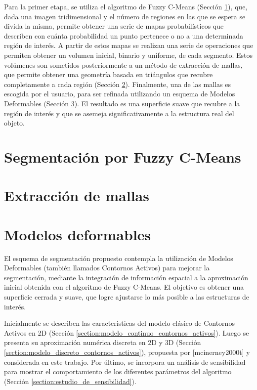 Para la primer etapa, se utiliza el algoritmo de Fuzzy C-Means (Sección \ref{section:segmentacion_fuzzy}), que, dada una imagen tridimensional y el número de regiones en las que se espera se divida la misma, permite obtener una serie de mapas probabilísticos que describen con cuánta probabilidad un punto pertenece o no a una determinada región de interés. A partir de estos mapas se realizan una serie de operaciones que permiten obtener un volumen inicial, binario y uniforme, de cada segmento. Estos volúmenes son sometidos posteriormente a un método de extracción de mallas, que permite obtener una geometría basada en triángulos que recubre completamente a cada región (Sección \ref{section:extraccion_de_mallas}). Finalmente, una de las mallas es escogida por el usuario, para ser refinada utilizando un esquema de Modelos Deformables (Sección \ref{section:modelos_deformables}). El resultado es una superficie suave que recubre a la región de interés y que se asemeja significativamente a la estructura real del objeto.

\section{Segmentación por Fuzzy C-Means}\label{section:segmentacion_fuzzy}

\section{Extracción de mallas}\label{section:extraccion_de_mallas}
\section{Modelos deformables}\label{section:modelos_deformables}
El esquema de segmentación propuesto contempla la utilización de Modelos Deformables (también llamados Contornos Activos) para mejorar la segmentación, mediante la integración de información espacial a la aproximación inicial obtenida con el algoritmo de Fuzzy C-Means. El objetivo es obtener una superficie cerrada y suave, que logre ajustarse lo más posible a las estructuras de interés.

Inicialmente se describen las caracteristicas del modelo clásico de Contornos Activos en 2D \citep{kass1988snakes} (Sección \ref{section:modelo_continuo_contornos_activos}). Luego se presenta su aproximación numérica discreta en 2D y 3D (Sección \ref{section:modelo_discreto_contornos_activos}), propuesta por \cite{} [mcinerney2000t] y considerada en este trabajo. Por último, se incorpora un análisis de sensibilidad para mostrar el comportamiento de los diferentes parámetros del algoritmo (Sección \ref{section:estudio_de_sensibilidad}).

